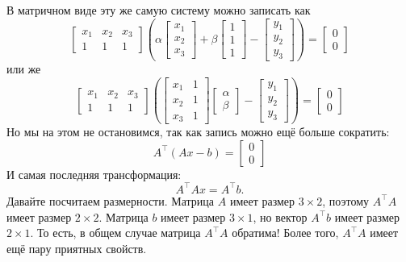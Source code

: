 \documentclass{article}
\begin{document}
В матричном виде эту же самую систему можно записать как
$$
\begin{bmatrix}x_1 & x_2 & x_3 \\ 1 & 1 & 1 \end{bmatrix}
\left(\alpha \begin{bmatrix}x_1  \\ x_2 \\x_3  \end{bmatrix}
+\beta \begin{bmatrix}1 \\ 1 \\1 \end{bmatrix} - 
\begin{bmatrix}y_1\\y_2\\y_3\end{bmatrix}\right) = \begin{bmatrix}0\\0\end{bmatrix}
$$
или же
$$
\begin{bmatrix}x_1 & x_2 & x_3 \\ 1 & 1 & 1 \end{bmatrix}
\left(
\begin{bmatrix}x_1  & 1 \\ x_2 & 1 \\x_3 & 1 \end{bmatrix}
\begin{bmatrix} \alpha \\ \beta \end{bmatrix}-
\begin{bmatrix} y_1 \\ y_2 \\ y_3 \end{bmatrix}
\right) = \begin{bmatrix}0\\0\end{bmatrix}
$$
Но мы на этом не остановимся, так как запись можно ещё больше сократить:
$$
A^\top (Ax - b)= \begin{bmatrix}0\\0\end{bmatrix}
$$
И самая последняя трансформация:
$$
A^\top Ax = A^\top b.
$$
Давайте посчитаем размерности. Матрица $A$ имеет размер $3\times 2$, поэтому $A^\top A$ имеет размер $2\times 2$. Матрица $b$ имеет размер $3\times 1$, но вектор $A^\top b$ имеет размер $2\times 1$.
То есть, в общем случае матрица $A^\top A$ обратима! Более того, $A^\top A$ имеет ещё пару приятных свойств.
\end{document}
